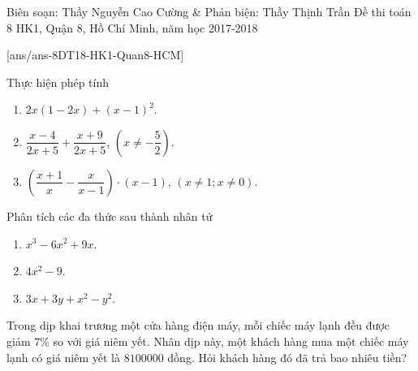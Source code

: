 \begin{name}
{Biên soạn: Thầy Nguyễn Cao Cường \& Phản biện: Thầy Thịnh Trần}
{Đề thi toán 8 HK1, Quận 8, Hồ Chí Minh, năm học 2017-2018}
\end{name}
\setcounter{bt}{0}
[ans/ans-8DT18-HK1-Quan8-HCM]

\begin{bt}%
	Thực hiện phép tính
	\begin{enumerate}
		\item $2x(1-2x)+(x-1)^2$.
		\item $\dfrac{x-4}{2x+5}+\dfrac{x+9}{2x+5}$, $\left(x\neq -\dfrac{5}{2}
		\right)$.
		\item $\left(\dfrac{x+1}{x}-\dfrac{x}{x-1}\right)\cdot (x-1)$, $\left(x\neq 1; x\neq 0\right)$.
	\end{enumerate}
\end{bt}
\begin{bt}%
	Phân tích các đa thức sau thành nhân tử
	\begin{enumerate}
		\item $x^3-6x^2+9x$.
		\item $4x^2-9$.
		\item $3x+3y+x^2-y^2$.
	\end{enumerate}
\end{bt}
\begin{bt}%
	Trong dịp khai trương một cửa hàng điện máy, mỗi chiếc máy lạnh 	đều được giảm $7\%$ so với giá niêm yết. Nhân dịp này, một khách hàng mua một chiếc máy
	lạnh có giá niêm yết là $8 100 000$ đồng. Hỏi khách hàng đó đã trả bao nhiêu tiền?
\end{bt}
